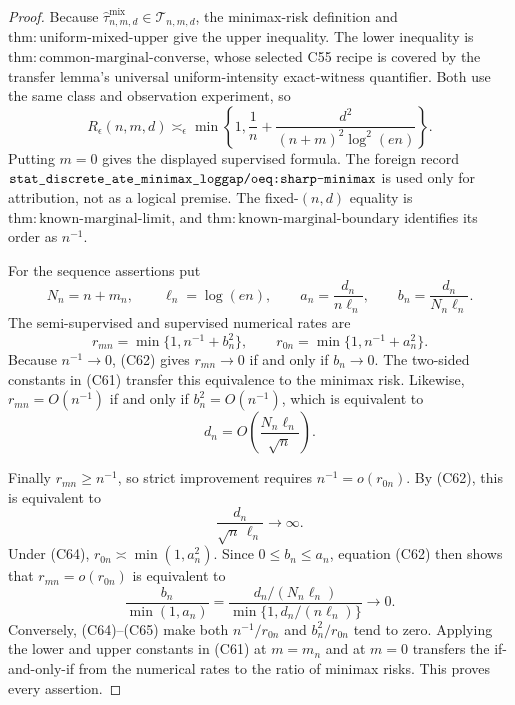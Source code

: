 \documentclass{article}
\begin{document}
\begin{proof}
Because \(\widehat\tau^{\mathrm{mix}}_{n,m,d}\in\mathcal T_{n,m,d}\), the minimax-risk definition and \(\mathrm{thm:uniform\mbox{-}mixed\mbox{-}upper}\) give the upper inequality.  The lower inequality is \(\mathrm{thm:common\mbox{-}marginal\mbox{-}converse}\), whose selected C55 recipe is covered by the transfer lemma's universal uniform-intensity exact-witness quantifier.  Both use the same class and observation experiment, so
\[
 R_\epsilon(n,m,d)\asymp_\epsilon
 \min\!\left\{1,\frac1n+\frac{d^2}{(n+m)^2\log^2(en)}\right\}.      \tag{C61}
\]
Putting \(m=0\) gives the displayed supervised formula.  The foreign record \(\texttt{stat\_discrete\_ate\_minimax\_loggap/oeq:sharp\mbox{-}minimax}\) is used only for attribution, not as a logical premise.  The fixed-\((n,d)\) equality is \(\mathrm{thm:known\mbox{-}marginal\mbox{-}limit}\), and \(\mathrm{thm:known\mbox{-}marginal\mbox{-}boundary}\) identifies its order as \(n^{-1}\).

For the sequence assertions put
\[
 N_n=n+m_n,\qquad \ell_n=\log(en),\qquad
 a_n=\frac{d_n}{n\ell_n},\qquad b_n=\frac{d_n}{N_n\ell_n}.
\]
The semi-supervised and supervised numerical rates are
\[
 r_{mn}=\min\{1,n^{-1}+b_n^2\},\qquad
 r_{0n}=\min\{1,n^{-1}+a_n^2\}.                                   \tag{C62}
\]
Because \(n^{-1}\to0\), (C62) gives \(r_{mn}\to0\) if and only if \(b_n\to0\).  The two-sided constants in (C61) transfer this equivalence to the minimax risk.  Likewise, \(r_{mn}=O(n^{-1})\) if and only if \(b_n^2=O(n^{-1})\), which is equivalent to
\[
 d_n=O\!\left(\frac{N_n\ell_n}{\sqrt n}\right).                   \tag{C63}
\]

Finally \(r_{mn}\ge n^{-1}\), so strict improvement requires \(n^{-1}=o(r_{0n})\).  By (C62), this is equivalent to
\[
 \frac{d_n}{\sqrt n\,\ell_n}\longrightarrow\infty.               \tag{C64}
\]
Under (C64), \(r_{0n}\asymp\min(1,a_n^2)\).  Since \(0\le b_n\le a_n\), equation (C62) then shows that \(r_{mn}=o(r_{0n})\) is equivalent to
\[
 \frac{b_n}{\min(1,a_n)}
 =\frac{d_n/(N_n\ell_n)}{\min\{1,d_n/(n\ell_n)\}}\longrightarrow0. \tag{C65}
\]
Conversely, (C64)--(C65) make both \(n^{-1}/r_{0n}\) and \(b_n^2/r_{0n}\) tend to zero.  Applying the lower and upper constants in (C61) at \(m=m_n\) and at \(m=0\) transfers the if-and-only-if from the numerical rates to the ratio of minimax risks.  This proves every assertion.
\end{proof}
\end{document}
